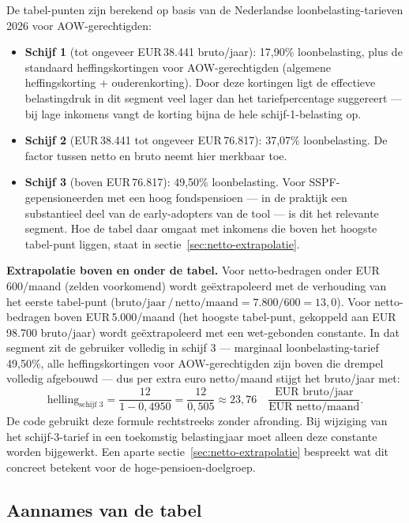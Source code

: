 \documentclass[11pt,a4paper]{article}
\begin{document}
De tabel-punten zijn berekend op basis van de Nederlandse loonbelasting-tarieven 2026 voor AOW-gerechtigden:

\begin{itemize}
\item \textbf{Schijf 1} (tot ongeveer EUR\,38.441 bruto/jaar): 17,90\% loonbelasting, plus de standaard heffingskortingen voor AOW-gerechtigden (algemene heffingskorting + ouderenkorting). Door deze kortingen ligt de effectieve belastingdruk in dit segment veel lager dan het tariefpercentage suggereert --- bij lage inkomens vangt de korting bijna de hele schijf-1-belasting op.
\item \textbf{Schijf 2} (EUR\,38.441 tot ongeveer EUR\,76.817): 37,07\% loonbelasting. De factor tussen netto en bruto neemt hier merkbaar toe.
\item \textbf{Schijf 3} (boven EUR\,76.817): 49,50\% loonbelasting. Voor SSPF-gepensioneerden met een hoog fondspensioen --- in de praktijk een substantieel deel van de early-adopters van de tool --- is dit het relevante segment. Hoe de tabel daar omgaat met inkomens die boven het hoogste tabel-punt liggen, staat in sectie~\ref{sec:netto-extrapolatie}.
\end{itemize}

\textbf{Extrapolatie boven en onder de tabel.} Voor netto-bedragen onder EUR\,600/maand (zelden voorkomend) wordt geëxtrapoleerd met de verhouding van het eerste tabel-punt ($\text{bruto/jaar}\,/\,\text{netto/maand} = 7.800/600 = 13{,}0$). Voor netto-bedragen boven EUR\,5.000/maand (het hoogste tabel-punt, gekoppeld aan EUR\,98.700 bruto/jaar) wordt geëxtrapoleerd met een wet-gebonden constante. In dat segment zit de gebruiker volledig in schijf 3 --- marginaal loonbelasting-tarief 49,50\%, alle heffingskortingen voor AOW-gerechtigden zijn boven die drempel volledig afgebouwd --- dus per extra euro netto/maand stijgt het bruto/jaar met:
\begin{equation}
\text{helling}_{\text{schijf 3}} = \frac{12}{1 - 0{,}4950} = \frac{12}{0{,}505} \approx 23{,}76 \quad \frac{\text{EUR bruto/jaar}}{\text{EUR netto/maand}}.
\end{equation}
De code gebruikt deze formule rechtstreeks zonder afronding. Bij wijziging van het schijf-3-tarief in een toekomstig belastingjaar moet alleen deze constante worden bijgewerkt. Een aparte sectie~\ref{sec:netto-extrapolatie} bespreekt wat dit concreet betekent voor de hoge-pensioen-doelgroep.

\subsection{Aannames van de tabel}
\end{document}
